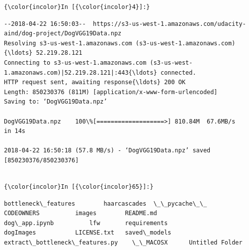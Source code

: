 \documentclass[11pt]{article}
\begin{document}
    \begin{Verbatim}[commandchars=\\\{\}]
{\color{incolor}In [{\color{incolor}4}]:} 
\end{Verbatim}


    \begin{Verbatim}[commandchars=\\\{\}]
--2018-04-22 16:50:03--  https://s3-us-west-1.amazonaws.com/udacity-aind/dog-project/DogVGG19Data.npz
Resolving s3-us-west-1.amazonaws.com (s3-us-west-1.amazonaws.com){\ldots} 52.219.28.121
Connecting to s3-us-west-1.amazonaws.com (s3-us-west-1.amazonaws.com)|52.219.28.121|:443{\ldots} connected.
HTTP request sent, awaiting response{\ldots} 200 OK
Length: 850230376 (811M) [application/x-www-form-urlencoded]
Saving to: ‘DogVGG19Data.npz’

DogVGG19Data.npz    100\%[===================>] 810.84M  67.6MB/s    in 14s     

2018-04-22 16:50:18 (57.8 MB/s) - ‘DogVGG19Data.npz’ saved [850230376/850230376]


    \end{Verbatim}

    \begin{Verbatim}[commandchars=\\\{\}]
{\color{incolor}In [{\color{incolor}65}]:} 
\end{Verbatim}


    \begin{Verbatim}[commandchars=\\\{\}]
bottleneck\_features		haarcascades  \_\_pycache\_\_
CODEOWNERS			images	      README.md
dog\_app.ipynb			lfw	      requirements
dogImages			LICENSE.txt   saved\_models
extract\_bottleneck\_features.py	\_\_MACOSX      Untitled Folder

    \end{Verbatim}


    
    
    
    
\end{document}
